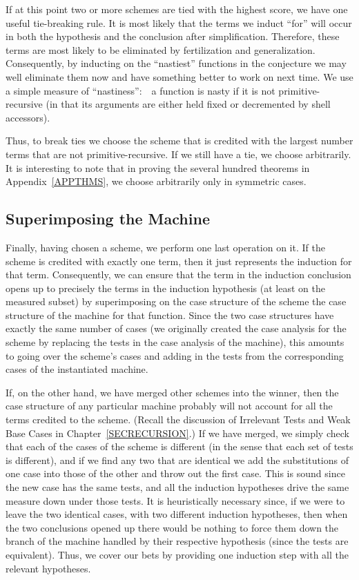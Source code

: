 \documentclass[11pt]{book}
\newcommand{\pubdefaulttextsize}{\large}
\begin{document}
If at this point two or more schemes are tied with the highest
score, we have  one useful tie-breaking rule.  It is most likely that the
terms we induct ``for'' will occur in both the hypothesis and the conclusion
after simplification.  Therefore, these terms are most likely
to be eliminated by fertilization and generalization.  Consequently,
by inducting on the ``nastiest'' functions in the conjecture we may
well eliminate them now and have something better to work on
next time.  We use a simple measure of ``nastiness'':~~a function is nasty
if it is not primitive-recursive (in that its arguments are either held fixed
or decremented by shell accessors).

Thus, to break ties we choose the scheme that is credited with the 
largest number terms that are not primitive-recursive.  If we still have a tie,
we choose arbitrarily.  It is interesting to note that in proving
the several hundred theorems in Appendix~\ref{APPTHMS}, we choose arbitrarily only in symmetric cases.
\subsection{Superimposing the Machine}
\pubdefaulttextsize
Finally, having chosen a scheme, we perform one last operation
on it.  If the scheme is credited with exactly one term, then
it just represents the induction for that term.  Consequently, we
can ensure that the term in the induction conclusion opens up to
precisely the terms in the induction hypothesis (at least
on the measured subset) by superimposing
on the case structure of the scheme the case structure of
the machine for that function.  Since the two case structures have
exactly the same number of cases (we originally created the
case analysis for the scheme by replacing the tests in the
case analysis of the machine), this  amounts to going
over the scheme's cases and adding in the tests from the 
corresponding cases of the instantiated machine.

If, on the other hand, we have merged other schemes into the
winner, then the case structure of any particular machine probably will
not account for all the terms credited to the scheme.  (Recall
the discussion of Irrelevant Tests and Weak Base Cases in Chapter~\ref{SECRECURSION}.)  If we have merged,
we simply check that each of the cases of the scheme is
different (in the sense that each set of tests is different), and if we
find any two that are identical we add the substitutions of one case into those of
the other and throw out the first case.  This is sound since the new case has
the same tests, and all the induction hypotheses drive the same
measure down under those tests.  It is heuristically necessary since,
if we were to leave the two identical cases, with two different induction hypotheses,
then when the two conclusions opened up there would be nothing to force them
down the branch of the machine handled by their respective hypothesis (since the tests
are equivalent).  Thus, we cover our bets by providing one induction step
with all the relevant hypotheses.
\end{document}
